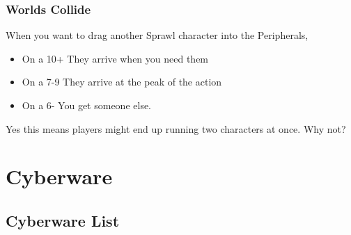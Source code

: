 \documentclass{tufte-book}
\begin{document}
\subsection{Worlds Collide}
When you want to drag another Sprawl character into the Peripherals, 
\begin{itemize} 
	\item On a 10+ They arrive when you need them
	\item On a 7-9 They arrive at the peak of the action
	\item On a 6- You get someone else. 
\end{itemize}
Yes this means players might end up running two characters at once. Why not?


\chapter{Cyberware} \label{ch:cyberware}
\section{Cyberware List} \label{sec: Cyberware list}
\end{document}
